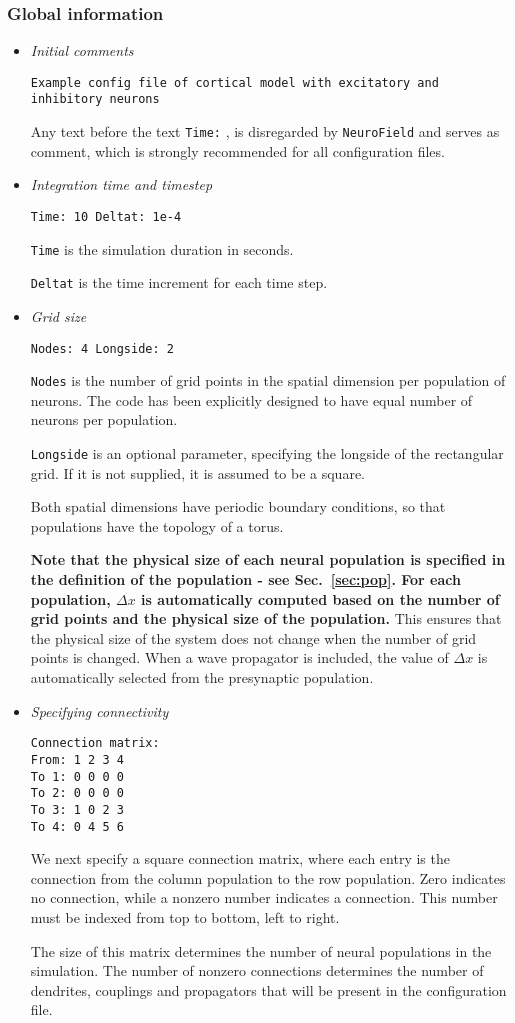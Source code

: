 \documentclass[12pt,a4paper]{article}
\newcommand{\type}[1]{{\small\small\tt #1} }
\newcommand{\NF}[0]{\type{NeuroField}}
\begin{document}
\clearpage


\subsubsection{Global information}
\label{sec:global}

\begin{itemize}
\item {\em Initial comments}
\begin{lstlisting}
Example config file of cortical model with excitatory and inhibitory neurons
\end{lstlisting}
Any text before the text \type{Time:}, is disregarded by \NF and serves as comment, which is strongly recommended for all configuration files.
\item  {\em Integration time and timestep}
\begin{lstlisting}
Time: 10 Deltat: 1e-4
\end{lstlisting}
\type{Time} is the simulation duration in seconds.

\type{Deltat} is the time increment for each time step.
\item  {\em Grid size}
\begin{lstlisting}
Nodes: 4 Longside: 2
\end{lstlisting}
\type{Nodes} is the number of grid points in the spatial dimension per population of neurons. The code has been explicitly designed to have equal number of neurons per population.

\type{Longside} is an optional parameter, specifying the longside of the rectangular grid. If it is not supplied, it is assumed to be a square.

Both spatial dimensions have periodic boundary conditions, so that populations have the topology of a torus.

{\bf Note that the physical size of each neural population is specified in the definition of the population - see Sec.~\ref{sec:pop}. For each population, $\Delta x$ is automatically computed based on the number of grid points and the physical size of the population.} This ensures that the physical size of the system does not change when the number of grid points is changed. When a wave propagator is included, the value of $\Delta x$ is automatically selected from the presynaptic population. 

\item {\em Specifying connectivity}
\begin{lstlisting}
Connection matrix:
From: 1 2 3 4
To 1: 0 0 0 0
To 2: 0 0 0 0
To 3: 1 0 2 3
To 4: 0 4 5 6
\end{lstlisting}
We next specify a square connection matrix, where each entry is the connection from the column population to the row population. Zero indicates no connection, while a nonzero number indicates a connection. This number must be indexed from top to bottom, left to right.

The size of this matrix determines the number of neural populations in the simulation. The number of nonzero connections determines the number of dendrites, couplings and propagators that will be present in the configuration file.
\end{itemize}
\end{document}
